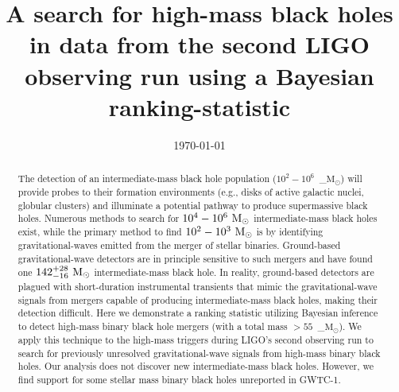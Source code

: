 \documentclass[%
 nofootinbib,
 amsmath,amssymb,
 aps,
 twocolumn,
 superscriptaddress
]{revtex4-2}
\newcommand{\mathcmd}[1]{{\sc \relax\ifmmode#1\else $#1$\fi}\xspace}
\newcommand{\msun}{\mathcmd{\text{M}_\odot}}
\begin{document}
\title{A search for high-mass black holes in data from the second LIGO observing run using a Bayesian ranking-statistic}




\date{\today}


\begin{abstract}
The detection of an intermediate-mass black hole population ($10^2-10^6$~\msun) will provide probes to their formation environments (e.g., disks of active galactic nuclei, globular clusters) and illuminate a potential pathway to produce supermassive black holes. Numerous methods to search for $10^4-10^6\ \msun$ intermediate-mass black holes exist, while the primary method to find $10^2-10^3\ \msun$ is by identifying gravitational-waves emitted from the merger of stellar binaries. Ground-based gravitational-wave detectors are in principle sensitive to such mergers and have found one $142^{+28}_{-16}\ \msun$ intermediate-mass black hole. In reality, ground-based detectors are plagued with short-duration instrumental transients that mimic the gravitational-wave signals from mergers capable of producing intermediate-mass black holes, making their detection difficult. Here we demonstrate a ranking statistic utilizing Bayesian inference to detect high-mass binary black hole mergers (with a total mass $>55$~\msun). We apply this technique to the high-mass triggers during LIGO's second observing run to search for previously unresolved gravitational-wave signals from high-mass binary black holes. Our analysis does not discover new intermediate-mass black holes. However, we find support for some stellar mass binary black holes unreported in GWTC-1.
\end{abstract}


\maketitle

\end{document}
